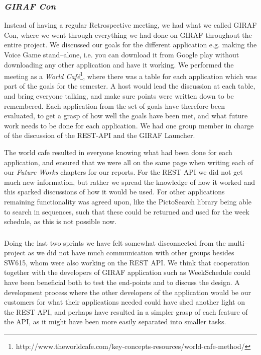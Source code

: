 \subsubsection*{\textit{GIRAF Con}}
Instead of having a regular Retrospective meeting, we had what we called GIRAF Con, where we went through everything we had done on GIRAF throughout the entire project.
We discussed our goals for the different application e.g. making the Voice Game stand--alone, i.e. you can download it from Google play without downloading any other application and have it working. 
We performed the meeting as a \textit{World Café}\footnote{http://www.theworldcafe.com/key-concepts-resources/world-cafe-method/}, where there was a table for each application which was part of the goals for the semester.
A host would lead the discussion at each table, and bring everyone talking, and make sure points were written down to be remembered.
Each application from the set of goals have therefore been evaluated, to get a grasp of how well the goals have been met, and what future work needs to be done for each application.
We had one group member in charge of the discussion of the REST-API and the GIRAF Launcher.

The world cafe resulted in everyone knowing what had been done for each application, and ensured that we were all on the same page when writing each of our \textit{Future Works} chapters for our reports. 
For the REST API we did not get much new information, but rather we spread the knowledge of how it worked and this sparked discussions of how it would be used.
For other applications remaining functionality was agreed upon, like the PictoSearch library being able to search in sequences, such that these could be returned and used for the week schedule, as this is not possible now.

\subsubsection*{}
Doing the last two sprints we have felt somewhat disconnected from the multi--project as we did not have much communication with other groups besides SW615, whom were also working on the REST API.
We think that cooperation together with the developers of GIRAF application such as WeekSchedule could have been beneficial both to test the end-points and to discuss the design.
A development process where the other developers of the application would be our customers for what their applications needed could have shed another light on the REST API, and perhaps have resulted in a simpler grasp of each feature of the API, as it might have been more easily separated into smaller tasks.


